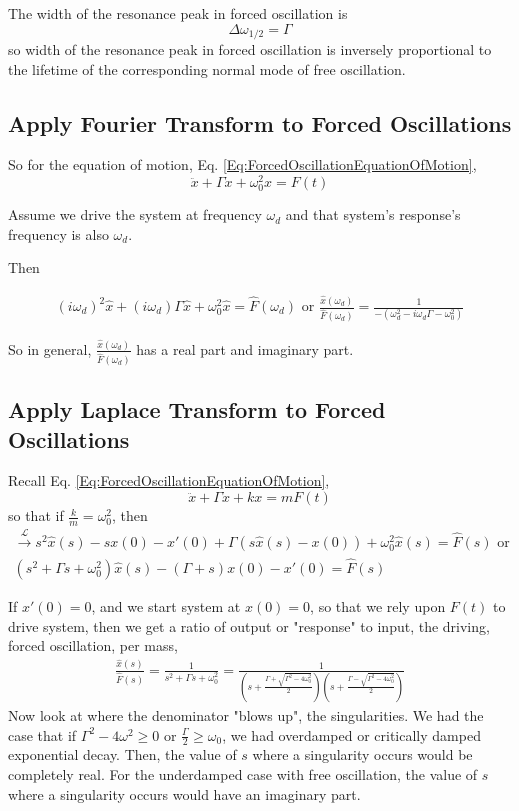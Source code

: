 \documentclass[10pt]{amsart}
\begin{document}
\begin{multicols*}{2}
The width of the resonance peak in forced oscillation is 
\[
\Delta \omega_{1/2} = \Gamma
\]
so width of the resonance peak in forced oscillation is inversely proportional to the lifetime of the corresponding normal mode of free oscillation.

\subsection{Apply Fourier Transform to Forced Oscillations}

So for the equation of motion, Eq. \ref{Eq:ForcedOscillationEquationOfMotion},
\[
\ddot{x} + \Gamma \dot{x} + \omega_0^2 x = F(t)
\]

Assume we drive the system at frequency $\omega_d$ and that system's response's frequency is also $\omega_d$.

Then

\[
\begin{gathered}
(i\omega_d)^2 \widehat{x} + (i\omega_d) \Gamma \widehat{x} + \omega_0^2 \widehat{x} = \widehat{F}(\omega_d) \text{ or } \frac{ \widehat{x}(\omega_d) }{ \widehat{F}(\omega_d) } = \frac{1}{ - (\omega_d^2 - i \omega_d \Gamma - \omega_0^2) }
\end{gathered}
\]

So in general, $\frac{ \widehat{x}(\omega_d) }{ \widehat{F}(\omega_d) }$ has a real part and imaginary part.

\subsection{Apply Laplace Transform to Forced Oscillations}

Recall Eq. \ref{Eq:ForcedOscillationEquationOfMotion},
\[
\ddot{x} + \Gamma \dot{x} + k x = mF(t)
\]
so that if $\frac{k}{m} = \omega_0^2$, then
\[
\begin{gathered}
\xrightarrow{ \mathcal{L}} s^2 \widehat{x}(s) - s x(0) - x'(0) + \Gamma (s\widehat{x}(s) - x(0)) + \omega_0^2 \widehat{x}(s) = \widehat{F}(s) \text{ or } \\
(s^2 + \Gamma s + \omega_0^2) \widehat{x}(s) - (\Gamma + s) x(0) - x'(0) = \widehat{F}(s)
\end{gathered}
\]

If $x'(0) = 0$, and we start system at $x(0) =0$, so that we rely upon $F(t)$ to drive system, then we get a ratio of output or "response" to input, the driving, forced oscillation, per mass,
\[
\begin{gathered}
	\frac{ \widehat{x}(s) }{ \widehat{F}(s) } = \frac{1}{ s^2 + \Gamma s + \omega_0^2 } = \frac{1}{ \left( s + \frac{ \Gamma + \sqrt{ \Gamma^2 - 4 \omega_0^2 } }{ 2 } \right) \left( s + \frac{ \Gamma - \sqrt{ \Gamma^2 - 4 \omega_0^2 } }{ 2} \right) }
\end{gathered}
\]
Now look at where the denominator "blows up", the singularities. We had the case that if $\Gamma^2 - 4\omega^2 \geq 0 $ or $\frac{\Gamma}{2} \geq \omega_0$, we had overdamped or critically damped exponential decay. Then, the value of $s$ where a singularity occurs would be completely real. For the underdamped case with free oscillation, the value of $s$ where a singularity occurs would have an imaginary part.


\end{multicols*}
\end{document}
